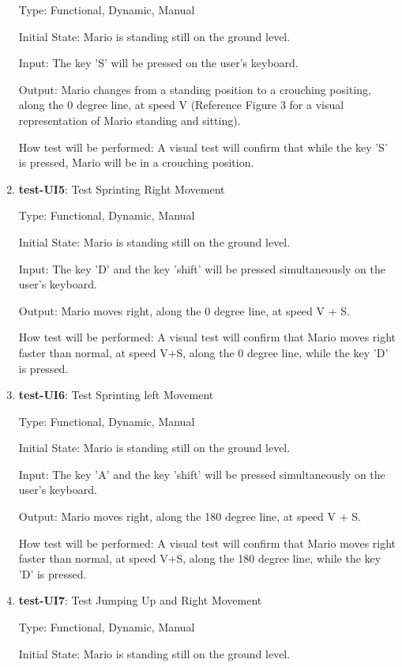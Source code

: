 \documentclass[12pt, titlepage]{article}
\begin{document}
\begin{enumerate}
Type: Functional, Dynamic, Manual

Initial State: Mario is standing still on the ground level.

Input: The key 'S' will be pressed on the user's keyboard.

Output: Mario changes from a standing position to a crouching positing, along the 0 degree line, at speed V (Reference Figure 3 for a visual representation of Mario standing and sitting).

How test will be performed: A visual test will confirm that while the key 'S' is pressed, Mario will be in a crouching position.

\item{\textbf{test-UI5}: Test Sprinting Right Movement\\}

Type: Functional, Dynamic, Manual

Initial State: Mario is standing still on the ground level.

Input: The key 'D' and the key 'shift' will be pressed simultaneously on the user's keyboard.

Output: Mario moves right, along the 0 degree line, at speed V + S.

How test will be performed: A visual test will confirm that Mario moves right faster than normal, at speed V+S, along the 0 degree line, while the key 'D' is pressed.

\item{\textbf{test-UI6}: Test Sprinting left Movement\\}

Type: Functional, Dynamic, Manual

Initial State: Mario is standing still on the ground level.

Input: The key 'A' and the key 'shift' will be pressed simultaneously on the user's keyboard.

Output: Mario moves right, along the 180 degree line, at speed V + S.

How test will be performed: A visual test will confirm that Mario moves right faster than normal, at speed V+S, along the 180 degree line, while the key 'D' is pressed.

\item{\textbf{test-UI7}: Test Jumping Up and Right Movement\\}

Type: Functional, Dynamic, Manual

Initial State: Mario is standing still on the ground level.


\end{enumerate}
\end{document}
